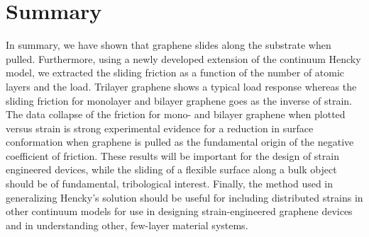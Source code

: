 \section{Summary}
In summary, we have shown that graphene slides along the substrate when pulled.
Furthermore, using a newly developed extension of the continuum Hencky model, we extracted the sliding friction as a function of the number of atomic layers and the load.
Trilayer graphene shows a typical load response whereas the sliding friction for monolayer and bilayer graphene goes as the inverse of strain.
The data collapse of the friction for mono- and bilayer graphene when plotted versus strain is strong experimental evidence for a reduction in surface conformation when graphene is pulled as the fundamental origin of the negative coefficient of friction.
These results will be important for the design of strain engineered devices\cite{Pereira2009a}, while the sliding of a flexible surface along a bulk object should be of fundamental, tribological interest.
Finally, the method used in generalizing Hencky's solution should be useful for including distributed strains in other continuum models for use in designing strain-engineered graphene devices and in understanding other, few-layer material systems.